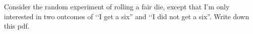   Consider the random experiment of rolling a fair die, except that
  I'm only interested in two outcomes of \lq\lq I get a six''
  and \lq\lq I did not get a six''.
  Write down this pdf.
